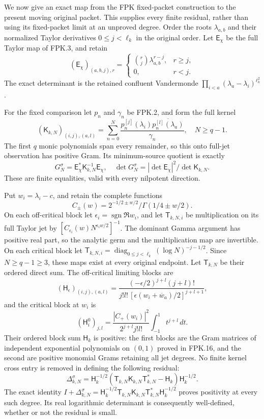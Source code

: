 We now give an exact map from the FPK fixed-packet construction to
the present moving original packet. This supplies every finite
residual, rather than using its fixed-packet limit at an unproved
degree. Order the roots $\lambda_{a,b}$ and their normalized
Taylor derivatives $0\le j<\ell_k$ in the original order. Let
$\mathsf E_\chi$ be the full Taylor map of FPK.3, and retain
\[
(\mathsf E_\chi)_{(a,b,j),r}
=\begin{cases}\binom rj\lambda_{a,b}^{r-j},&r\ge j,\\0,&r<j.
\end{cases}
\]
The exact determinant is the retained confluent Vandermonde
$\prod_{i<a}(\lambda_a-\lambda_i)^{\ell_k^2}$.

For the fixed comparison let $p_n$ and $\gamma_n$ be FPK.2, and
form the full kernel
\[
(\mathsf K_{k,N})_{(i,j),(a,l)}
=\sum_{n=0}^N\frac{p_n^{[j]}(\lambda_i)
                         \overline{p_n^{[l]}(\lambda_a)}}{\gamma_n},
\quad N\ge q-1.
\tag{TWA18}
\]
The first $q$ monic polynomials span every remainder, so this
onto full-jet observation has positive Gram. Its minimum-source
quotient is exactly
\[
G_N^\sigma=\mathsf E_\chi^*\mathsf K_{k,N}^{-1}\mathsf E_\chi,
\quad
\det G_N^\sigma=|\det\mathsf E_\chi|^2/\det\mathsf K_{k,N}.
\tag{TWA19}
\]
These are finite equalities, valid with every nilpotent direction.

Put $w_i=\lambda_i-c$, and retain the complete functions
\[
C_\pm(w)=2^{-1/2\pm w/2}/\Gamma(1/4\pm w/2).
\]
On each off-critical block let $\epsilon_i=\operatorname{sgn}\Re w_i$,
and let $\mathsf T_{k,N,i}$ be multiplication on its full Taylor
jet by $[C_{\epsilon_i}(w)N^{\epsilon_iw/2}]^{-1}$.
The dominant Gamma argument has positive real part, so the
analytic germ and the multiplication map are invertible. On
each critical block let
$\mathsf T_{k,N,i}=\operatorname{diag}_{0\le j<\ell_k}
(\log N)^{-j-1/2}$. Since $N\ge q-1\ge3$, these maps exist at
every original endpoint. Let $\mathsf T_{k,N}$ be their ordered
direct sum. The off-critical limiting blocks are
\[
(\mathsf H_\epsilon)_{(i,j),(a,l)}
=\frac{(-\epsilon/2)^{j+l}(j+l)!}
{j!l!\,[\epsilon(w_i+\overline w_a)/2]^{j+l+1}},
\]
and the critical block at $w_i$ is
\[
(\mathsf H_i^0)_{j,l}
=\frac{|C_+(w_i)|^2}{2^{j+l}j!l!}\int_{-1}^1t^{j+l}\,dt.
\]
Their ordered block sum $\mathsf H_k$ is positive: the first
blocks are the Gram matrices of independent exponential
polynomials on $(0,1)$ proved in FPK.16, and the second are
positive monomial Grams retaining all jet degrees. No finite
kernel cross entry is removed in defining the following residual:
\[
\Delta_{k,N}^\sigma
=\mathsf H_k^{-1/2}
 (\mathsf T_{k,N}\mathsf K_{k,N}\mathsf T_{k,N}^*
                                      -\mathsf H_k)
 \mathsf H_k^{-1/2}.
\tag{TWA20}
\]
The exact identity $I+\Delta_{k,N}^\sigma
=\mathsf H_k^{-1/2}\mathsf T_{k,N}\mathsf K_{k,N}
\mathsf T_{k,N}^*\mathsf H_k^{-1/2}$ proves positivity at every
such degree. Its real logarithmic determinant is consequently
well-defined, whether or not the residual is small.

